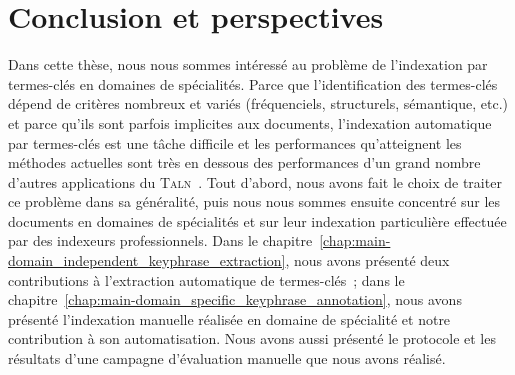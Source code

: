 \chapter{Conclusion et perspectives}
\label{chap:main-conclusion}

  Dans cette thèse, nous nous sommes intéressé au problème de l'indexation par
  termes-clés en domaines de spécialités. Parce que l'identification des
  termes-clés dépend de critères nombreux et variés (fréquenciels, structurels,
  sémantique, etc.) et parce qu'ils sont parfois implicites aux documents,
  l'indexation automatique par termes-clés est une tâche difficile et les
  performances qu'atteignent les méthodes actuelles sont très en dessous des
  performances d'un grand nombre d'autres applications du
  \textsc{Taln}~\cite{hasan2014state_of_the_art}. Tout d'abord, nous avons fait
  le choix de traiter ce problème dans sa généralité, puis nous nous sommes
  ensuite concentré sur les documents en domaines de spécialités et sur leur
  indexation particulière effectuée par des indexeurs professionnels. Dans le
  chapitre~\ref{chap:main-domain_independent_keyphrase_extraction}, nous avons
  présenté deux contributions à l'extraction automatique de termes-clés~; dans
  le chapitre~\ref{chap:main-domain_specific_keyphrase_annotation}, nous avons
  présenté l'indexation manuelle réalisée en domaine de spécialité et notre
  contribution à son automatisation. Nous avons aussi présenté le protocole et
  les résultats d'une campagne d'évaluation manuelle que nous avons réalisé.

